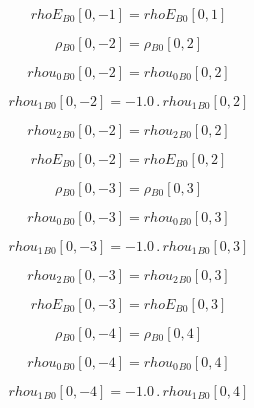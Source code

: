 \documentclass{article}
\begin{document}
\begin{dmath}{rhoE{_{B0}}}[{0,-1}] = {rhoE{_{B0}}}[{0,1}]\end{dmath}

\begin{dmath}{\rho{_{B0}}}[{0,-2}] = {\rho{_{B0}}}[{0,2}]\end{dmath}

\begin{dmath}{rhou_{0}{_{B0}}}[{0,-2}] = {rhou_{0}{_{B0}}}[{0,2}]\end{dmath}

\begin{dmath}{rhou_{1}{_{B0}}}[{0,-2}] = - 1.0 \,.\, {rhou_{1}{_{B0}}}[{0,2}]\end{dmath}

\begin{dmath}{rhou_{2}{_{B0}}}[{0,-2}] = {rhou_{2}{_{B0}}}[{0,2}]\end{dmath}

\begin{dmath}{rhoE{_{B0}}}[{0,-2}] = {rhoE{_{B0}}}[{0,2}]\end{dmath}

\begin{dmath}{\rho{_{B0}}}[{0,-3}] = {\rho{_{B0}}}[{0,3}]\end{dmath}

\begin{dmath}{rhou_{0}{_{B0}}}[{0,-3}] = {rhou_{0}{_{B0}}}[{0,3}]\end{dmath}

\begin{dmath}{rhou_{1}{_{B0}}}[{0,-3}] = - 1.0 \,.\, {rhou_{1}{_{B0}}}[{0,3}]\end{dmath}

\begin{dmath}{rhou_{2}{_{B0}}}[{0,-3}] = {rhou_{2}{_{B0}}}[{0,3}]\end{dmath}

\begin{dmath}{rhoE{_{B0}}}[{0,-3}] = {rhoE{_{B0}}}[{0,3}]\end{dmath}

\begin{dmath}{\rho{_{B0}}}[{0,-4}] = {\rho{_{B0}}}[{0,4}]\end{dmath}

\begin{dmath}{rhou_{0}{_{B0}}}[{0,-4}] = {rhou_{0}{_{B0}}}[{0,4}]\end{dmath}

\begin{dmath}{rhou_{1}{_{B0}}}[{0,-4}] = - 1.0 \,.\, {rhou_{1}{_{B0}}}[{0,4}]\end{dmath}
\end{document}
